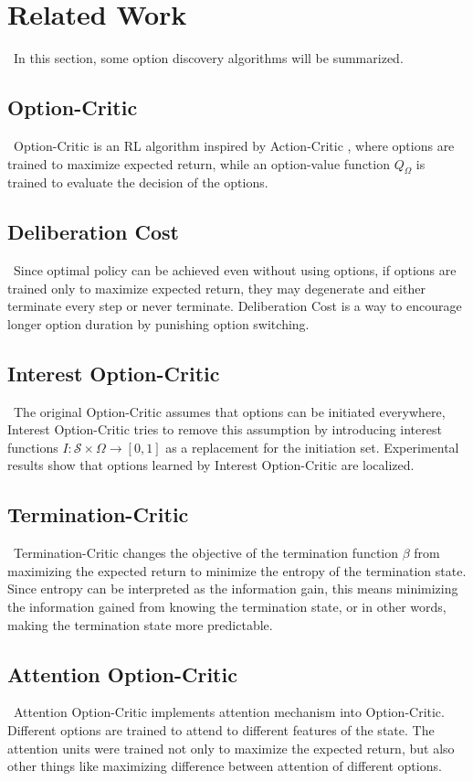 \documentclass{article}
\begin{document}
	\section{Related Work}
	\qquad \ In this section, some option discovery algorithms will be summarized.
	\subsection*{Option-Critic}
	\qquad \ Option-Critic \cite{bacon2016optioncritic} is an RL algorithm inspired by Action-Critic \cite{Konda00actor-criticalgorithms}, where options are trained to maximize expected return, while an option-value function $Q_\Omega$ is trained to evaluate the decision of the options.
	\subsection*{Deliberation Cost}
	\qquad \ Since optimal policy can be achieved even without using options, if options are trained only to maximize expected return, they may degenerate and either terminate every step or never terminate. Deliberation Cost \cite{harb2017waiting} is a way to encourage longer option duration by punishing option switching.
	\subsection*{Interest Option-Critic}
	\qquad \ The original Option-Critic assumes that options can be initiated everywhere, Interest Option-Critic \cite{khetarpal2020options} tries to remove this assumption by introducing interest functions $I:\mathcal{S} \times \Omega \rightarrow [0,1]$ as a replacement for the initiation set. Experimental results show that options learned by Interest Option-Critic are localized.
	\subsection*{Termination-Critic}
	\qquad \ Termination-Critic \cite{harutyunyan2019termination} changes the objective of the termination function $\beta$ from maximizing the expected return to minimize the entropy of the termination state. Since entropy can be interpreted as the information gain, this means minimizing the information gained from knowing the termination state, or in other words, making the termination state more predictable.
	\subsection*{Attention Option-Critic}
	\qquad \ Attention Option-Critic \cite{attentionoptioncritic} implements attention mechanism into Option-Critic. Different options are trained to attend to different features of the state. The attention units were trained not only to maximize the expected return, but also other things like maximizing difference between attention of different options.
\end{document}
